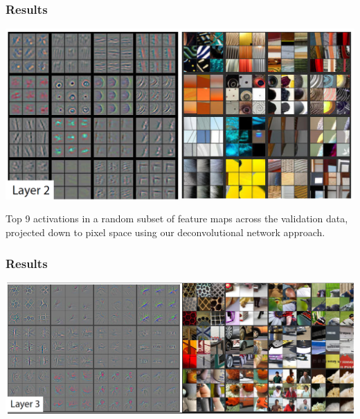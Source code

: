 \begin{frame}
	\frametitle{Results}
	
\begin{center}
	\includegraphics[scale=0.7]{figs/ZFnet_layer2}
\end{center}

Top 9 activations in a random subset
of feature maps across the validation data, projected down to pixel space using our deconvolutional network approach.
\end{frame}

\begin{frame}
	\frametitle{Results}
	
	\begin{center}
		\includegraphics[scale=0.5]{figs/ZFnet_layer3}
	\end{center}
\end{frame}

